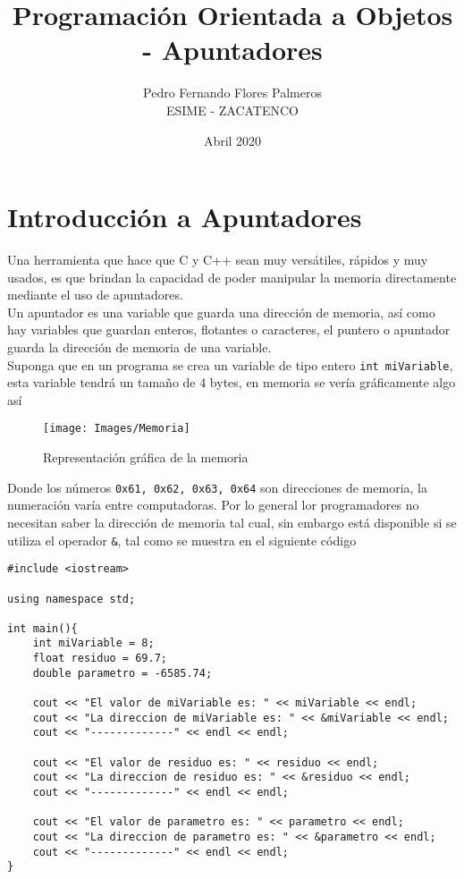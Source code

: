 \documentclass[12pt]{extarticle}
\title{Programación Orientada a Objetos - Apuntadores}
\author{Pedro Fernando Flores Palmeros \\ ESIME - ZACATENCO}
\date{Abril 2020}
\newcommand{\<}{\langle}
\renewcommand{\>}{\rangle}
\theoremstyle{definition}
\begin{document}
\maketitle



\section{Introducción a Apuntadores}
Una herramienta que hace que C y C++ sean muy versátiles, rápidos y muy usados, es que brindan la capacidad de poder manipular la memoria directamente mediante el uso de apuntadores.\\

Un apuntador es una variable que guarda una dirección de memoria, así como hay variables que guardan enteros, flotantes o caracteres, el puntero o apuntador guarda la dirección de memoria de una variable.\\

Suponga que en un programa se crea un variable de tipo entero \verb|int miVariable|, esta variable tendrá un tamaño de 4 bytes, en memoria se vería gráficamente algo así

\begin{figure}[thpb]
	\centering
	\texttt{[image: Images/Memoria]}      
	\caption{Representación gráfica de la memoria }
	\label{Fig::LimitCycle_01_A}
\end{figure}

Donde los números \verb|0x61, 0x62, 0x63, 0x64| son direcciones de memoria, la numeración varía entre computadoras. Por lo general lor programadores no necesitan saber la dirección de memoria tal cual, sin embargo está disponible si se utiliza el operador \verb|&|, tal como se muestra en el siguiente código


\begin{lstlisting}[caption={Obtención de la dirección de una variable},captionpos=b]
#include <iostream>

using namespace std; 

int main(){
	int miVariable = 8;
	float residuo = 69.7;
	double parametro = -6585.74;
	
	cout << "El valor de miVariable es: " << miVariable << endl;
	cout << "La direccion de miVariable es: " << &miVariable << endl; 
	cout << "-------------" << endl << endl; 
	
	cout << "El valor de residuo es: " << residuo << endl;
	cout << "La direccion de residuo es: " << &residuo << endl; 
	cout << "-------------" << endl << endl; 
	
	cout << "El valor de parametro es: " << parametro << endl;
	cout << "La direccion de parametro es: " << &parametro << endl; 
	cout << "-------------" << endl << endl; 
}
\end{lstlisting}
\end{document}
